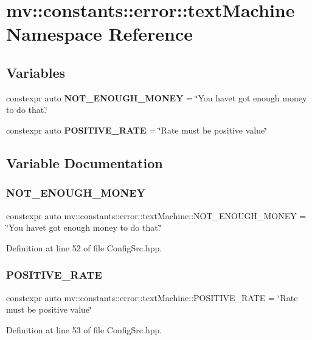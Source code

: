 \section{mv\+:\+:constants\+:\+:error\+:\+:text\+Machine Namespace Reference}
\label{namespacemv_1_1constants_1_1error_1_1text_machine}
\subsection*{Variables}
\begin{DoxyCompactItemize}
\item 
constexpr auto \textbf{ N\+O\+T\+\_\+\+E\+N\+O\+U\+G\+H\+\_\+\+M\+O\+N\+EY} = \char`\"{}You have\textquotesingle{}t got enough money to do that.\char`\"{}
\item 
constexpr auto \textbf{ P\+O\+S\+I\+T\+I\+V\+E\+\_\+\+R\+A\+TE} = \char`\"{}Rate must be positive value\char`\"{}
\end{DoxyCompactItemize}


\subsection{Variable Documentation}
\mbox{\label{namespacemv_1_1constants_1_1error_1_1text_machine_a499075fee99de8023678eeff77b9b7c3}} 
\subsubsection{N\+O\+T\+\_\+\+E\+N\+O\+U\+G\+H\+\_\+\+M\+O\+N\+EY}
{\footnotesize\ttfamily constexpr auto mv\+::constants\+::error\+::text\+Machine\+::\+N\+O\+T\+\_\+\+E\+N\+O\+U\+G\+H\+\_\+\+M\+O\+N\+EY = \char`\"{}You have\textquotesingle{}t got enough money to do that.\char`\"{}}



Definition at line 52 of file Config\+Src.\+hpp.

\mbox{\label{namespacemv_1_1constants_1_1error_1_1text_machine_a742fd57bb90be441c5f432d1790b91e1}} 
\subsubsection{P\+O\+S\+I\+T\+I\+V\+E\+\_\+\+R\+A\+TE}
{\footnotesize\ttfamily constexpr auto mv\+::constants\+::error\+::text\+Machine\+::\+P\+O\+S\+I\+T\+I\+V\+E\+\_\+\+R\+A\+TE = \char`\"{}Rate must be positive value\char`\"{}}



Definition at line 53 of file Config\+Src.\+hpp.

